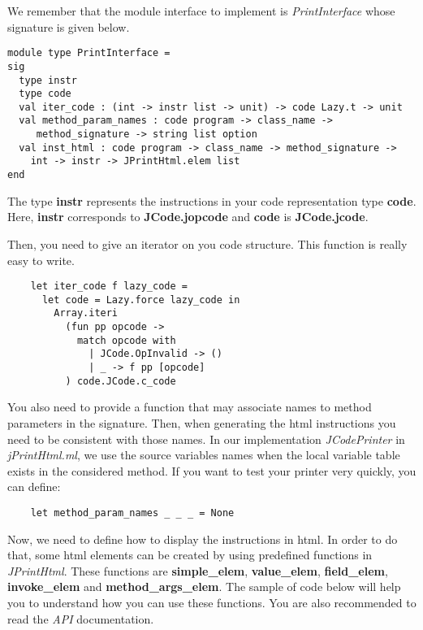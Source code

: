 \documentclass{article}
\begin{document}
We remember that the module interface to implement is
\emph{PrintInterface} whose signature is given below.

\begin{verbatim}
module type PrintInterface =
sig
  type instr
  type code
  val iter_code : (int -> instr list -> unit) -> code Lazy.t -> unit
  val method_param_names : code program -> class_name ->
     method_signature -> string list option
  val inst_html : code program -> class_name -> method_signature ->
    int -> instr -> JPrintHtml.elem list
end
\end{verbatim}
The type \textbf{instr} represents the instructions in your code
representation type \textbf{code}. Here, \textbf{instr} corresponds
to \textbf{JCode.jopcode} and \textbf{code} is
\textbf{JCode.jcode}.

Then, you need to give an iterator on you code structure. This
function is really easy to write.

\begin{verbatim}
    let iter_code f lazy_code =
      let code = Lazy.force lazy_code in
        Array.iteri
          (fun pp opcode ->
            match opcode with
              | JCode.OpInvalid -> ()
              | _ -> f pp [opcode]
          ) code.JCode.c_code
\end{verbatim}
You also need to provide a function that may associate names to
method parameters in the signature. Then, when generating the html
instructions you need to be consistent with those names. In our
implementation \emph{JCodePrinter} in \emph{jPrintHtml.ml}, we use
the source variables names when the local variable table exists in
the considered method. If you want to test your printer very
quickly, you can define:

\begin{verbatim}
    let method_param_names _ _ _ = None
\end{verbatim}
Now, we need to define how to display the instructions in html. In
order to do that, some html elements can be created by using
predefined functions in \emph{JPrintHtml}. These functions are
\textbf{simple\_elem}, \textbf{value\_elem}, \textbf{field\_elem},
\textbf{invoke\_elem} and \textbf{method\_args\_elem}. The sample
of code below will help you to understand how you can use these
functions. You are also recommended to read the \emph{API}
documentation.
\end{document}
